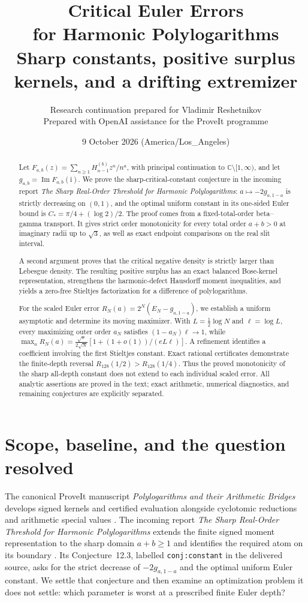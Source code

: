 \documentclass[11pt]{article}
\title{\textbf{Critical Euler Errors\\for Harmonic Polylogarithms}\\[7pt]
\large Sharp constants, positive surplus kernels, and a drifting extremizer}
\author{Research continuation prepared for Vladimir Reshetnikov\\
\small Prepared with OpenAI assistance for the ProveIt programme}
\date{9 October 2026 (America/Los\_Angeles)}
\numberwithin{equation}{section}
\theoremstyle{definition}\newtheorem{definition}[theorem]{Definition}
\theoremstyle{remark}\newtheorem{remark}[theorem]{Remark}
\newcommand{\ii}{\mathrm i}
\newcommand{\C}{\mathbb C}
\newcommand{\cut}{\C\setminus[1,\infty)}
\newcommand{\Cstar}{C_*}
\DeclareMathOperator{\Impart}{Im}
\begin{document}
\maketitle\thispagestyle{empty}
\begin{abstract}
Let $F_{a,b}(z)=\sum_{n\ge1}H_{n-1}^{(b)}z^n/n^a$, with principal
continuation to $\cut$, and let $g_{a,b}=\Impart F_{a,b}(\ii)$.
We prove the sharp-critical-constant conjecture in the incoming report
\emph{The Sharp Real-Order Threshold for Harmonic Polylogarithms}:
$a\mapsto-2g_{a,1-a}$ is strictly decreasing on $(0,1)$, and the optimal
uniform constant in its one-sided Euler bound is
$\Cstar=\pi/4+(\log2)/2$.
The proof comes from a fixed-total-order beta--gamma transport. It gives
strict order monotonicity for every total order $a+b>0$ at imaginary
radii up to $\sqrt3$, as well as exact endpoint comparisons on the real
slit interval.

A second argument proves that the critical negative density is strictly
larger than Lebesgue density. The resulting positive surplus has an exact
balanced Bose-kernel representation, strengthens the harmonic-defect
Hausdorff moment inequalities, and yields a zero-free Stieltjes
factorization for a difference of polylogarithms.

For the scaled Euler error $R_N(a)=2^N(E_N-g_{a,1-a})$, we establish a
uniform asymptotic and determine its moving maximizer. With
$L=\frac12\log N$ and $\ell=\log L$, every maximizing outer order $a_N$
satisfies $(1-a_N)\ell\to1$, while
$\max_aR_N(a)=\frac{\sqrt\pi}{2\sqrt N}
[1+(1+o(1))/(eL\ell)]$.
A refinement identifies a coefficient involving the first Stieltjes
constant. Exact rational certificates demonstrate the finite-depth
reversal $R_{128}(1/2)>R_{128}(1/4)$.
Thus the proved monotonicity of the sharp all-depth constant does not
extend to each individual scaled error. All analytic assertions are
proved in the text; exact arithmetic, numerical diagnostics, and remaining
conjectures are explicitly separated.
\end{abstract}
\clearpage
\begingroup\small\setlength{\parskip}{0pt}\tableofcontents\endgroup
\clearpage

\section{Scope, baseline, and the question resolved}
\label{sec:scope}
The canonical ProveIt manuscript \emph{Polylogarithms and their Arithmetic
Bridges} develops signed kernels and certified evaluation alongside
cyclotomic reductions and arithmetic special values \cite{manuscript}.
The incoming report \emph{The Sharp Real-Order Threshold for Harmonic
Polylogarithms} extends the finite signed moment representation to the
sharp domain $a+b\ge1$ and identifies the required atom on its boundary
\cite{threshold}. Its Conjecture~12.3, labelled
\texttt{conj:constant} in the delivered source, asks for the strict decrease
of $-2g_{a,1-a}$ and the optimal uniform Euler constant. We settle that
conjecture and then examine an optimization problem it does not settle:
which parameter is worst at a prescribed finite Euler depth?
\end{document}
